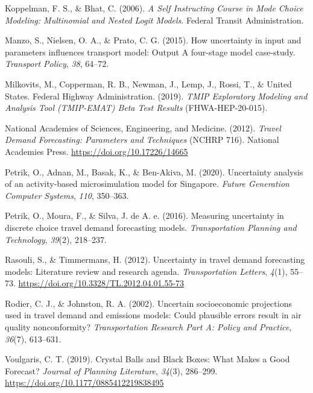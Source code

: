 \documentclass[
  letterpaper,
  number,
  review,
  3p]{elsarticle}
\newlength{\cslhangindent}
\newenvironment{CSLReferences}[2] %
 {\begin{list}{}{%
  \setlength{\itemindent}{0pt}
  \setlength{\leftmargin}{0pt}
  \setlength{\parsep}{0pt}
  \ifodd #1
   \setlength{\leftmargin}{\cslhangindent}
   \setlength{\itemindent}{-1\cslhangindent}
  \fi
  \setlength{\itemsep}{#2\baselineskip}}}
 {\end{list}}
\begin{document}
\begin{CSLReferences}{1}{0}
Koppelman, F. S., \& Bhat, C. (2006). \emph{A {Self Instructing Course}
in {Mode Choice Modeling}: {Multinomial} and {Nested Logit Models}}.
Federal Transit Administration.

Manzo, S., Nielsen, O. A., \& Prato, C. G. (2015). How uncertainty in
input and parameters influences transport model: Output {A} four-stage
model case-study. \emph{Transport Policy}, \emph{38}, 64--72.

Milkovits, M., Copperman, R. B., Newman, J., Lemp, J., Rossi, T., \&
United States. Federal Highway Administration. (2019). \emph{{TMIP
Exploratory Modeling} and {Analysis Tool} ({TMIP-EMAT}) {Beta Test
Results}} (FHWA-HEP-20-015).

National Academies of Sciences, Engineering, and Medicine. (2012).
\emph{Travel {Demand Forecasting}: {Parameters} and {Techniques}} (NCHRP
716). National Academies Press. \url{https://doi.org/10.17226/14665}

Petrik, O., Adnan, M., Basak, K., \& Ben-Akiva, M. (2020). Uncertainty
analysis of an activity-based microsimulation model for {Singapore}.
\emph{Future Generation Computer Systems}, \emph{110}, 350--363.

Petrik, O., Moura, F., \& Silva, J. de A. e. (2016). Measuring
uncertainty in discrete choice travel demand forecasting models.
\emph{Transportation Planning and Technology}, \emph{39}(2), 218--237.

Rasouli, S., \& Timmermans, H. (2012). Uncertainty in travel demand
forecasting models: Literature review and research agenda.
\emph{Transportation Letters}, \emph{4}(1), 55--73.
\url{https://doi.org/10.3328/TL.2012.04.01.55-73}

Rodier, C. J., \& Johnston, R. A. (2002). Uncertain socioeconomic
projections used in travel demand and emissions models: Could plausible
errors result in air quality nonconformity? \emph{Transportation
Research Part A: Policy and Practice}, \emph{36}(7), 613--631.

Voulgaris, C. T. (2019). Crystal {Balls} and {Black Boxes}: {What Makes}
a {Good Forecast}? \emph{Journal of Planning Literature}, \emph{34}(3),
286--299. \url{https://doi.org/10.1177/0885412219838495}


\end{CSLReferences}
\end{document}
